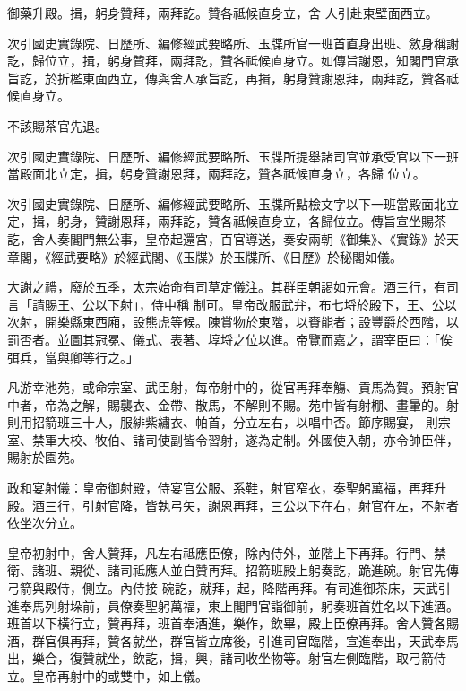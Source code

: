 \begin{pinyinscope}
 御藥升殿。揖，躬身贊拜，兩拜訖。贊各祗候直身立，舍
 人引赴東壁面西立。



 次引國史實錄院、日歷所、編修經武要略所、玉牒所官一班首直身出班、斂身稱謝訖，歸位立，揖，躬身贊拜，兩拜訖，贊各祗候直身立。如傳旨謝恩，知閣門官承旨訖，於折檻東面西立，傳與舍人承旨訖，再揖，躬身贊謝恩拜，兩拜訖，贊各祗候直身立。



 不該賜茶官先退。



 次引國史實錄院、日歷所、編修經武要略所、玉牒所提舉諸司官並承受官以下一班當殿面北立定，揖，躬身贊謝恩拜，兩拜訖，贊各祗候直身立，各歸
 位立。



 次引國史實錄院、日歷所、編修經武要略所、玉牒所點檢文字以下一班當殿面北立定，揖，躬身，贊謝恩拜，兩拜訖，贊各祗候直身立，各歸位立。傳旨宣坐賜茶訖，舍人奏閣門無公事，皇帝起還宮，百官導送，奏安兩朝《御集》、《實錄》於天章閣，《經武要略》於經武閣、《玉牒》於玉牒所、《日歷》於秘閣如儀。



 大謝之禮，廢於五季，太宗始命有司草定儀注。其群臣朝謁如元會。酒三行，有司言「請賜王、公以下射」，侍中稱
 制可。皇帝改服武弁，布七埒於殿下，王、公以次射，開樂縣東西廂，設熊虎等候。陳賞物於東階，以賚能者；設豐爵於西階，以罰否者。並圖其冠冕、儀式、表著、埻埒之位以進。帝覽而嘉之，謂宰臣曰：「俟弭兵，當與卿等行之。」



 凡游幸池苑，或命宗室、武臣射，每帝射中的，從官再拜奉觴、貢馬為賀。預射官中者，帝為之解，賜襲衣、金帶、散馬，不解則不賜。苑中皆有射棚、畫暈的。射則用招箭班三十人，服緋紫繡衣、帕首，分立左右，以唱中否。節序賜宴，
 則宗室、禁軍大校、牧伯、諸司使副皆令習射，遂為定制。外國使入朝，亦令帥臣伴，賜射於園苑。



 政和宴射儀：皇帝御射殿，侍宴官公服、系鞋，射官窄衣，奏聖躬萬福，再拜升殿。酒三行，引射官降，皆執弓矢，謝恩再拜，三公以下在右，射官在左，不射者依坐次分立。



 皇帝初射中，舍人贊拜，凡左右祗應臣僚，除內侍外，並階上下再拜。行門、禁衛、諸班、親從、諸司祗應人並自贊再拜。招箭班殿上躬奏訖，跪進碗。射官先傳弓箭與殿侍，側立。內侍接
 碗訖，就拜，起，降階再拜。有司進御茶床，天武引進奉馬列射垛前，員僚奏聖躬萬福，東上閣門官詣御前，躬奏班首姓名以下進酒。班首以下橫行立，贊再拜，班首奉酒進，樂作，飲畢，殿上臣僚再拜。舍人贊各賜酒，群官俱再拜，贊各就坐，群官皆立席後，引進司官臨階，宣進奉出，天武奉馬出，樂合，復贊就坐，飲訖，揖，興，諸司收坐物等。射官左側臨階，取弓箭侍立。皇帝再射中的或雙中，如上儀。




\end{pinyinscope}
